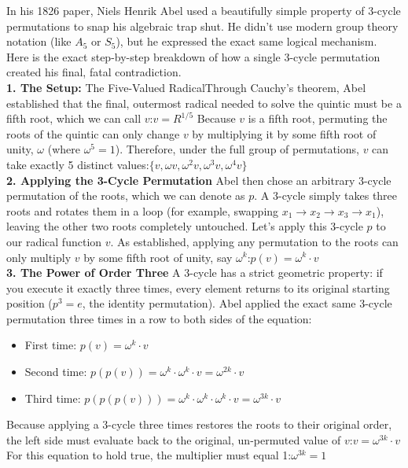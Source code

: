 In his 1826 paper, Niels Henrik Abel used a beautifully simple property of 3-cycle permutations to snap his algebraic trap shut.
He didn't use modern group theory notation (like \(A_{5}\) or \(S_{5}\)), but he expressed the exact same logical mechanism. 
Here is the exact step-by-step breakdown of how a single 3-cycle permutation created his final, fatal contradiction.\\

{\bf 1. The Setup:} 
The Five-Valued RadicalThrough Cauchy's theorem, Abel established that the final, outermost radical needed to solve the quintic must be a fifth root, which we can call \(v\):\(v=R^{1/5}\)
Because \(v\) is a fifth root, permuting the roots of the quintic can only change \(v\) by multiplying it by some fifth root of unity, \(\omega \) (where \(\omega^5 = 1\)). 
Therefore, under the full group of permutations, \(v\) can take exactly 5 distinct values:\(\{v,\omega v,\omega ^{2}v,\omega ^{3}v,\omega ^{4}v\}\) \\

{\bf 2. Applying the 3-Cycle Permutation}
Abel then chose an arbitrary 3-cycle permutation of the roots, which we can denote as \(p\). 
A 3-cycle simply takes three roots and rotates them in a loop (for example, swapping \(x_1 \to x_2 \to x_3 \to x_1\)), 
leaving the other two roots completely untouched.
Let's apply this 3-cycle \(p\) to our radical function \(v\). 
As established, applying any permutation to the roots can only multiply \(v\) by some fifth root of unity, say \(\omega ^{k}\):\(p(v)=\omega ^{k}\cdot v\) \\

{\bf 3. The Power of Order Three}
A 3-cycle has a strict geometric property: if you execute it exactly three times, every element returns to its original starting position (\(p^3 = e\), the identity permutation).
Abel applied the exact same 3-cycle permutation three times in a row to both sides of the equation:
\begin{itemize}
\item[]First time: \(p(v) = \omega^k \cdot v\)
\item[]Second time: \(p(p(v)) = \omega^k \cdot \omega^k \cdot v = \omega^{2k} \cdot v\)
\item[]Third time: \(p(p(p(v))) = \omega^k \cdot \omega^k \cdot \omega^k \cdot v = \omega^{3k} \cdot v\)
\end{itemize}
Because applying a 3-cycle three times restores the roots to their original order, the left side must evaluate back to the original, un-permuted value of \(v\):\(v=\omega ^{3k}\cdot v\)
For this equation to hold true, the multiplier must equal 1:\(\omega ^{3k}=1\) \\

